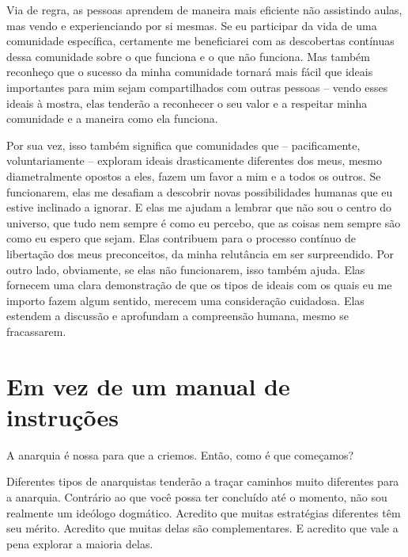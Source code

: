 Via de regra, as pessoas aprendem de maneira mais eficiente não assistindo aulas, mas vendo e experienciando por si mesmas. Se eu participar da vida de uma comunidade específica, certamente me beneficiarei com as descobertas contínuas dessa comunidade sobre o que funciona e o que não funciona. Mas também reconheço que o sucesso da minha comunidade tornará mais fácil que ideais importantes para mim sejam compartilhados com outras pessoas -- vendo esses ideais à mostra, elas tenderão a reconhecer o seu valor e a respeitar minha comunidade e a maneira como ela funciona.

Por sua vez, isso também significa que comunidades que -- pacificamente, voluntariamente -- exploram ideais drasticamente diferentes dos meus, mesmo diametralmente opostos a eles, fazem um favor a mim e a todos os outros. Se funcionarem, elas me desafiam a descobrir novas possibilidades humanas que eu estive inclinado a ignorar. E elas me ajudam a lembrar que não sou o centro do universo, que tudo nem sempre é como eu percebo, que as coisas nem sempre são como eu espero que sejam. Elas contribuem para o processo contínuo de libertação dos meus preconceitos, da minha relutância em ser surpreendido. Por outro lado, obviamente, se elas não funcionarem, isso também ajuda. Elas fornecem uma clara demonstração de que os tipos de ideais com os quais eu me importo fazem algum sentido, merecem uma consideração cuidadosa. Elas estendem a discussão e aprofundam a compreensão humana, mesmo se fracassarem.

\section{Em vez de um manual de instruções}

A anarquia é nossa para que a criemos. Então, como é que começamos?

Diferentes tipos de anarquistas tenderão a traçar caminhos muito diferentes para a anarquia. Contrário ao que você possa ter concluído até o momento, não sou realmente um ideólogo dogmático. Acredito que muitas estratégias diferentes têm seu mérito. Acredito que muitas delas são complementares. E acredito que vale a pena explorar a maioria delas.


